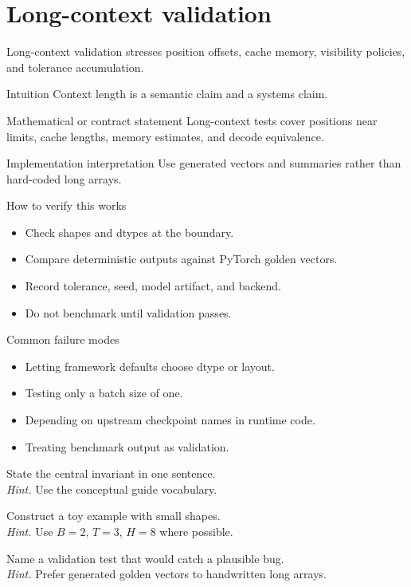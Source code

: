 \chapter{Long-context validation}
\label{ch:long-context}
Long-context validation stresses position offsets, cache memory, visibility policies, and tolerance accumulation.



\begin{intuitionbox}{Intuition}
Context length is a semantic claim and a systems claim.
\end{intuitionbox}

\begin{definitionbox}{Mathematical or contract statement}
Long-context tests cover positions near limits, cache lengths, memory estimates, and decode equivalence.
\end{definitionbox}

\begin{implementationbox}{Implementation interpretation}
Use generated vectors and summaries rather than hard-coded long arrays.
\end{implementationbox}

\begin{verificationbox}{How to verify this works}
\begin{itemize}
\item Check shapes and dtypes at the boundary.
\item Compare deterministic outputs against PyTorch golden vectors.
\item Record tolerance, seed, model artifact, and backend.
\item Do not benchmark until validation passes.
\end{itemize}
\end{verificationbox}

\begin{warningbox}{Common failure modes}
\begin{itemize}
\item Letting framework defaults choose dtype or layout.
\item Testing only a batch size of one.
\item Depending on upstream checkpoint names in runtime code.
\item Treating benchmark output as validation.
\end{itemize}
\end{warningbox}

\begin{chapterexercises}
\item State the central invariant in one sentence.\\
\textit{Hint.} Use the conceptual guide vocabulary.
\item Construct a toy example with small shapes.\\
\textit{Hint.} Use $B=2$, $T=3$, $H=8$ where possible.
\item Name a validation test that would catch a plausible bug.\\
\textit{Hint.} Prefer generated golden vectors to handwritten long arrays.
\end{chapterexercises}

